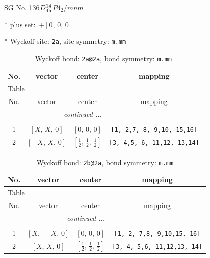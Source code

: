 \documentclass[fleqn,8pt]{jsarticle}
\begin{document}
\setcounter{MaxMatrixCols}{32}

\renewcommand{\tablename}{Table~}
\renewcommand{\figurename}{Figure~}
\begin{center}
\LARGE
SG No. 136\quad$D_{\rm 4h}^{14}$\quad$P4_2/mnm$\quad[ tetragonal ]
\end{center}

* plus set:\,\,\,$+\left[ 0,\, 0,\, 0 \right]$


* Wyckoff site: {\tt 2a}, site symmetry: {\tt m.mm}
\renewcommand{\arraystretch}{1.2}
\begin{longtable}{cccc}
\caption{Wyckoff bond: {\tt 2a@2a}, bond symmetry: {\tt m.mm}}
 \\
 \hline \hline
No. & vector & center & mapping \\ \hline \endfirsthead

\multicolumn{3}{l}{\tablename\ \thetable{}} \\
 \hline \hline
No. & vector & center & mapping \\ \hline \endhead

 \hline \hline
\multicolumn{3}{r}{\footnotesize\it continued ...} \\ \endfoot

 \hline \hline
\multicolumn{3}{r}{} \\ \endlastfoot

1 & $\left[ X,\, X,\, 0 \right]$ & $\left[ 0,\, 0,\, 0 \right]$ & {\tt [1,-2,7,-8,-9,10,-15,16]} \\ \hline
2 & $\left[ - X,\, X,\, 0 \right]$ & $\left[ \frac{1}{2},\, \frac{1}{2},\, \frac{1}{2} \right]$ & {\tt [3,-4,5,-6,-11,12,-13,14]} \\
\end{longtable}
\renewcommand{\arraystretch}{1.2}
\begin{longtable}{cccc}
\caption{Wyckoff bond: {\tt 2b@2a}, bond symmetry: {\tt m.mm}}
 \\
 \hline \hline
No. & vector & center & mapping \\ \hline \endfirsthead

\multicolumn{3}{l}{\tablename\ \thetable{}} \\
 \hline \hline
No. & vector & center & mapping \\ \hline \endhead

 \hline \hline
\multicolumn{3}{r}{\footnotesize\it continued ...} \\ \endfoot

 \hline \hline
\multicolumn{3}{r}{} \\ \endlastfoot

1 & $\left[ X,\, - X,\, 0 \right]$ & $\left[ 0,\, 0,\, 0 \right]$ & {\tt [1,-2,-7,8,-9,10,15,-16]} \\ \hline
2 & $\left[ X,\, X,\, 0 \right]$ & $\left[ \frac{1}{2},\, \frac{1}{2},\, \frac{1}{2} \right]$ & {\tt [3,-4,-5,6,-11,12,13,-14]} \\
\end{longtable}
\end{document}
